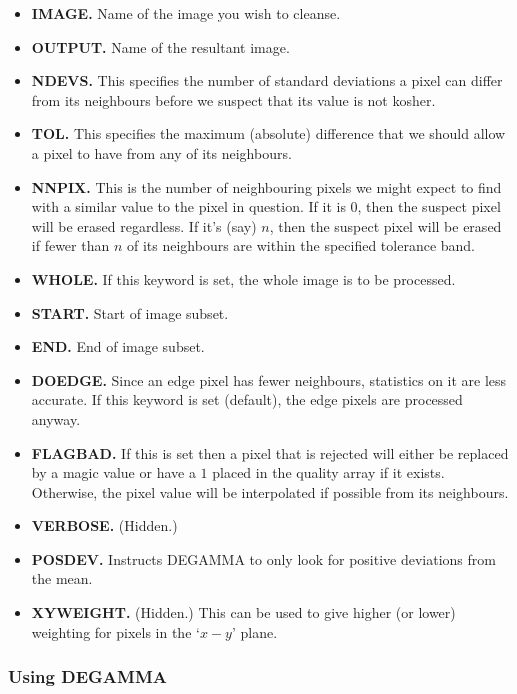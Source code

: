 \begin{itemize}
\item {\bf IMAGE.} Name of the image you wish to cleanse.
\item {\bf OUTPUT.} Name of the resultant image.
\item {\bf NDEVS.} This specifies the number of standard deviations a pixel can
differ from its neighbours before we suspect that its value is not kosher.
\item {\bf TOL.} This specifies the maximum (absolute) difference that we should
allow a pixel to have from any of its neighbours.
\item {\bf NNPIX.} This is the number of neighbouring pixels we might expect to
find with a similar value to the pixel in question. If it is 0, then the
suspect pixel will be erased regardless. If it's (say) $n$, then the suspect
pixel will be erased if fewer than $n$ of its neighbours are within the
specified tolerance band.
\item {\bf WHOLE.} If this keyword is set, the whole image is to be processed.
\item  {\bf START.} Start of image subset.
\item {\bf END.} End of image subset.
\item {\bf DOEDGE.} Since an edge pixel has fewer neighbours, statistics on it
are less accurate. If this keyword is set (default), the edge pixels are
processed anyway.
\item {\bf FLAGBAD.} If this is set then a pixel that is rejected will either
be replaced by a magic value or have a $1$ placed in the quality array if it
exists. Otherwise, the pixel value will be interpolated if possible from its
neighbours.
\item {\bf VERBOSE.} (Hidden.)
\item {\bf POSDEV.} Instructs DEGAMMA to only look for positive deviations from
the mean.
\item {\bf XYWEIGHT.} (Hidden.) This can be used to give higher (or lower)
weighting for pixels in the `$x-y$' plane. 
\end{itemize}

\subsubsection{Using DEGAMMA}

